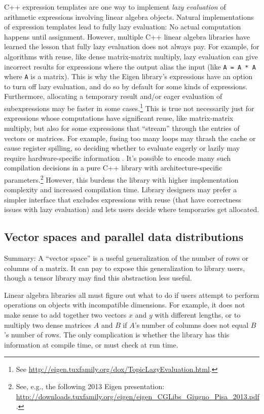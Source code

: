 C++ expression templates are one way to implement \emph{lazy
  evaluation} of arithmetic expressions involving linear algebra
objects.  Natural implementations of expression templates lead to
fully lazy evaluation: No actual computation happens until assignment.
However, multiple C++ linear algebra libraries have learned the lesson
that fully lazy evaluation does not always pay.  For example, for
algorithms with reuse, like dense matrix-matrix multiply, lazy
evaluation can give incorrect results for expressions where the output
alias the input (like \texttt{A = A * A} where \texttt{A} is a
matrix).  This is why the Eigen library's expressions have an option
to turn off lazy evaluation, and do so by default for some kinds of
expressions.  Furthermore, allocating a temporary result and/or eager
evaluation of subexpressions may be faster in some cases.\footnote{See
  \url{http://eigen.tuxfamily.org/dox/TopicLazyEvaluation.html}.}
This is true not necessarily just for expressions whose computations
have significant reuse, like matrix-matrix multiply, but also for some
expressions that ``stream'' through the entries of vectors or
matrices.  For example, fusing too many loops may thrash the cache or
cause register spilling, so deciding whether to evaluate eagerly or
lazily may require hardware-specific
information \cite{siek2008build}. It's possible to encode
many such compilation decisions in a pure C++ library with
architecture-specific parameters.\footnote{See, e.g., the following
  2013 Eigen presentation:
  \url{http://downloads.tuxfamily.org/eigen/eigen_CGLibs_Giugno_Pisa_2013.pdf}.}
However, this burdens the library with higher implementation
complexity and increased compilation time.  Library designers
may prefer a simpler interface that excludes expressions with reuse
(that have correctness issues with lazy evaluation) and lets users
decide where temporaries get allocated.

\subsection{Vector spaces and parallel data distributions}
\label{SS:features:spaces}

Summary: A ``vector space'' is a useful generalization of the number
of rows or columns of a matrix.  It can pay to expose this
generalization to library users, though a tensor library may find this
abstraction less useful.

Linear algebra libraries all must figure out what to do if users
attempt to perform operations on objects with incompatible dimensions.
For example, it does not make sense to add together two vectors $x$
and $y$ with different lengths, or to multiply two dense matrices $A$
and $B$ if $A$'s number of columns does not equal $B$'s number of
rows.  The only complication is whether the library has this
information at compile time, or must check at run time.

